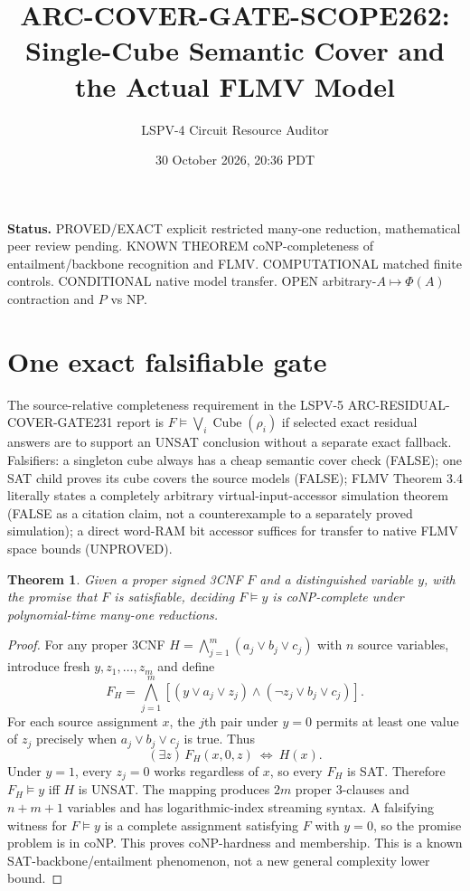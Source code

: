 \documentclass[11pt]{article}
\title{ARC-COVER-GATE-SCOPE262: Single-Cube Semantic Cover and the Actual FLMV Model}
\author{LSPV-4 Circuit Resource Auditor}
\date{30 October 2026, 20:36 PDT}
\newtheorem{theorem}{Theorem}
\begin{document}
\maketitle
\noindent\textbf{Status.} PROVED/EXACT explicit restricted many-one reduction, mathematical peer review pending. KNOWN THEOREM coNP-completeness of entailment/backbone recognition and FLMV. COMPUTATIONAL matched finite controls. CONDITIONAL native model transfer. OPEN arbitrary-$A\mapsto\Phi(A)$ contraction and $P$ vs NP.
\section{One exact falsifiable gate}
The source-relative completeness requirement in the LSPV-5 ARC-RESIDUAL-COVER-GATE231 report is $F\models\bigvee_i\operatorname{Cube}(\rho_i)$ if selected exact residual answers are to support an UNSAT conclusion without a separate exact fallback. Falsifiers: a singleton cube always has a cheap semantic cover check (FALSE); one SAT child proves its cube covers the source models (FALSE); FLMV Theorem 3.4 literally states a completely arbitrary virtual-input-accessor simulation theorem (FALSE as a citation claim, not a counterexample to a separately proved simulation); a direct word-RAM bit accessor suffices for transfer to native FLMV space bounds (UNPROVED).
\begin{theorem}
Given a proper signed 3CNF $F$ and a distinguished variable $y$, with the promise that $F$ is satisfiable, deciding $F\models y$ is coNP-complete under polynomial-time many-one reductions.
\end{theorem}
\begin{proof}
For any proper 3CNF $H=\bigwedge_{j=1}^m(a_j\vee b_j\vee c_j)$ with $n$ source variables, introduce fresh $y,z_1,\dots,z_m$ and define
\[
F_H=\bigwedge_{j=1}^m[(y\vee a_j\vee z_j)\land(\neg z_j\vee b_j\vee c_j)].
\]
For each source assignment $x$, the $j$th pair under $y=0$ permits at least one value of $z_j$ precisely when $a_j\vee b_j\vee c_j$ is true. Thus
\[
(\exists z)\,F_H(x,0,z)\ \Longleftrightarrow\ H(x).
\]
Under $y=1$, every $z_j=0$ works regardless of $x$, so every $F_H$ is SAT. Therefore $F_H\models y$ iff $H$ is UNSAT. The mapping produces $2m$ proper 3-clauses and $n+m+1$ variables and has logarithmic-index streaming syntax. A falsifying witness for $F\models y$ is a complete assignment satisfying $F$ with $y=0$, so the promise problem is in coNP. This proves coNP-hardness and membership. This is a known SAT-backbone/entailment phenomenon, not a new general complexity lower bound.
\end{proof}
\end{document}
